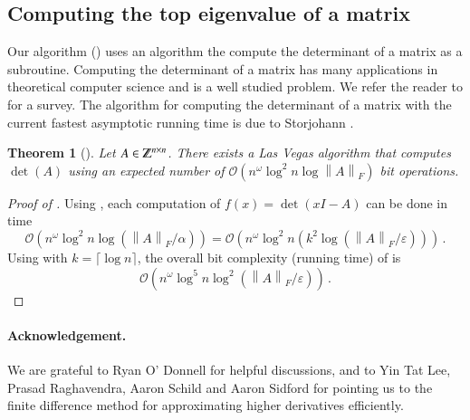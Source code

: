 \documentclass{article}[12pt]
\newtheorem{theorem}{Theorem}[section]
\theoremstyle{definition}
\renewcommand{\mathbb}{\varmathbb}
\newcommand{\mper}{\,.}
\newcommand{\paren}[1]{\left(#1 \right )}
\newcommand{\ceil}[1]{\lceil #1 \rceil}
\newcommand{\norm}[1]{\left\lVert#1\right\rVert}
\newcommand{\fnorm}[1]{\norm{#1}_F}
\newcommand{\Z}{{\mathbb Z}}
\newcommand{\e}{\epsilon}
\let\e\varepsilon
\newcommand{\bigO}{\mathcal{O}}
\newcommand{\bigo}[1]{\bigO\left(#1\right)}
\newcommand{\charp}{f}
\begin{document}
\subsection{Computing the top eigenvalue of a matrix}
\label{sec:matrix}

Our algorithm () uses an algorithm the compute the determinant of a matrix as a
subroutine.
Computing the determinant of a matrix has many applications in theoretical computer science
and is a well studied problem. We refer the reader to \cite{kv04} for a survey.
The algorithm for computing the determinant of a matrix with the current fastest asymptotic running time 
is due to Storjohann \cite{s05}.
\begin{theorem}[\cite{s05}]
\label{thm:fast-determinant}
Let $A \in \Z^{n \times n}$. There exists a Las Vegas algorithm that computes $\det (A)$
using an expected number of $\bigo{ n^{\omega} \log^2 n \log \fnorm{A} }$ bit operations.
\end{theorem}

\begin{proof}[Proof of ]
Using , each computation of $\charp(x) = \det(xI - A)$ can be done in time  
\[ \bigo{n^{\omega} \log^2n \log \paren{\fnorm{A}/\alpha}}  
	= \bigo{n^{\omega} \log^2n \paren{ k^2 \log \paren{ \fnorm{A}/\e }}} \mper \]
Using  with $k = \ceil{\log n}$, the overall bit complexity (running time) of  is 
\[ \bigo{ n^{\omega } \log^{5} n \log^2 \paren{\fnorm{A}/\e }}  \mper  \]
\end{proof}

\paragraph{Acknowledgement.} We are grateful to Ryan O' Donnell for helpful discussions, 
and to Yin Tat Lee, Prasad Raghavendra, Aaron Schild and Aaron Sidford for pointing us to the 
finite difference method for approximating higher derivatives efficiently. 



\end{document}
